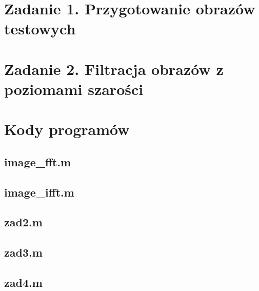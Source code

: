 





 


\section*{Zadanie 1. Przygotowanie obrazów testowych}
\section*{Zadanie 2. Filtracja obrazów z poziomami szarości}












\newpage \section*{Kody programów}

\subsection*{image\_fft.m     }
\subsection*{image\_ifft.m    } \newpage
\subsection*{zad2.m           } \newpage
\subsection*{zad3.m           } \newpage
\subsection*{zad4.m           } \newpage









